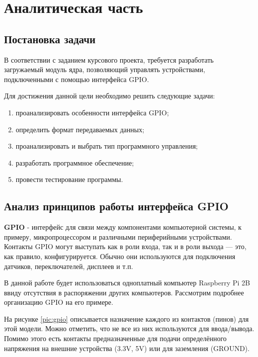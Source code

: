 \section{Аналитическая часть}

\subsection{Постановка задачи}\label{sec:task}
В соответствии с заданием курсового проекта, требуется разработать загружаемый модуль ядра, позволяющий управлять устройствами, подключенными с помощью интерфейса GPIO.

Для достижения данной цели необходимо решить следующие задачи:
\begin{enumerate}
	\item проанализировать особенности интерфейса GPIO;
	\item определить формат передаваемых данных;
	\item проанализировать и выбрать тип программного управления;
	\item разработать программное обеспечение;
	\item провести тестирование программы.
\end{enumerate}

\subsection{Анализ принципов работы интерфейса GPIO}
\textbf{GPIO} - интерфейс для связи между компонентами компьютерной системы, к примеру, микропроцессором и различными периферийными устройствами\cite{subj:def}. Контакты GPIO могут выступать как в роли входа, так и в роли выхода — это, как правило, конфигурируется. Обычно они используются для подключения датчиков, переключателей, дисплеев и т.п.

В данной работе будет использоваться одноплатный компьютер Raspberry Pi 2B ввиду отсутствия в распоряжении других компьютеров. Рассмотрим подробнее организацию GPIO на его примере.

На рисунке \ref{pic:gpio} описывается назначение каждого из контактов (пинов)  для этой модели. Можно отметить, что не все из них используются для ввода/вывода. Помимо этого есть контакты предназначенные для подачи определённого напряжения на внешние устройства (3.3V, 5V) или для заземления (GROUND).

